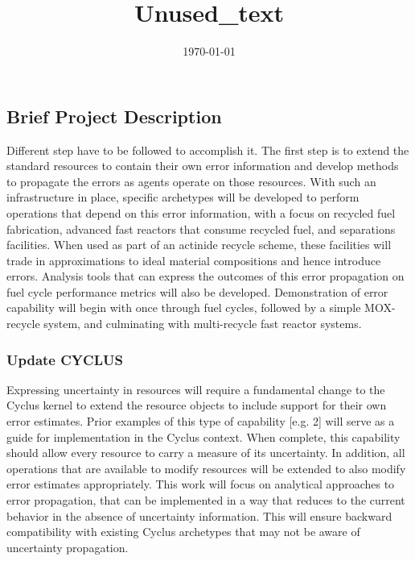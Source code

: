 \documentclass[dvips,12pt]{article}
\title{Unused_text}
\date{\today}
\begin{document}
\maketitle 




\subsection{Brief Project Description}
Different step have to be followed to accomplish it.
The first step is to extend the standard resources to contain their own error information and develop methods to propagate the errors as agents operate on those resources. With such an infrastructure in place, specific archetypes will be developed to perform operations that depend on this error information, with a focus on recycled fuel fabrication, advanced fast reactors that consume recycled fuel, and separations facilities. 
When used as part of an actinide recycle scheme, these facilities will trade in approximations to ideal material compositions and hence introduce errors. 
Analysis tools that can express the outcomes of this error propagation on fuel cycle performance metrics will also be developed. Demonstration of error capability will begin with once through fuel cycles, followed by a simple MOX-recycle system, and culminating with multi-recycle fast reactor systems.

\subsubsection{Update CYCLUS}%
Expressing uncertainty in resources will require a fundamental change to the Cyclus kernel to extend the resource objects to include support for their own error estimates.  Prior examples of this type of capability [e.g. 2] will serve as a guide for implementation in the Cyclus context.  When complete, this capability should allow every resource to carry a measure of its uncertainty.  In addition, all operations that are available to modify resources will be extended to also modify error estimates appropriately. This work will focus on analytical approaches to error propagation,  that can be implemented in a way that reduces to the current behavior in the absence of uncertainty information. This will ensure backward compatibility with existing Cyclus archetypes that may not be aware of uncertainty propagation.
\end{document}
